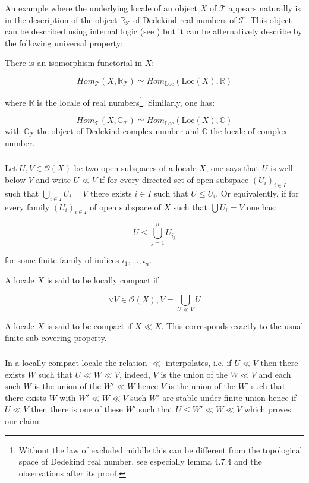 \documentclass[a4paper]{article}
\newcommand{\loc}{\text{Loc}}
\newcommand{\R}{\mathbb{R}}
\newcommand{\C}{\mathbb{C}}
\newcommand{\Tcal}{\mathcal{T}}
\newcommand{\Ocal}{\mathcal{O}}
\newcommand{\block}[1]
{

\par \subsubsection{} #1

\bigskip}
\newcommand{\blockn}[1]{\par #1 \bigskip}
\begin{document}
\blockn{An example where the underlying locale of an object $X$ of $\Tcal$ appears naturally is in the description of the object $\R_{\Tcal}$ of Dedekind real numbers of $\Tcal$. This object can be described using internal logic (see \cite[D4.7]{sketches}) but it can be alternatively describe by the following universal property:


There is an isomorphism functorial in $X$:

\[ Hom_{\Tcal}(X,\R_{\Tcal}) \simeq Hom_{\loc}(\loc(X), \R) \]

where $\R$ is the locale of real numbers\footnote{Without the law of excluded middle this can be different from the topological space of Dedekind real number, see \cite[D4.7]{sketches} especially lemma $4.7.4$ and the observations after its proof.}.
Similarly, one has:

\[ Hom_{\Tcal}(X,\C_{\Tcal}) \simeq Hom_{\loc}(\loc(X), \C) \]
with $\C_{\Tcal}$ the object of Dedekind complex number and $\C$ the locale of complex number.
}

\block{Let $U,V \in \Ocal(X)$ be two open subspaces of a locale $X$, one says that $U$ is well below $V$ and write $U \ll V$ if for every directed set of open subspace $(U_i)_{i \in I}$ such that $\bigcup_{i \in I} U_i =V$ there exists $i \in I$ such that $U \leqslant U_i$. Or equivalently, if for every family $(U_i)_{i \in I}$ of open subspace of $X$ such that $\bigcup U_i = V$ one has:

\[ U \leqslant \bigcup_{j=1}^n U_{i_j} \]

for some finite family of indices $i_1,\dots, i_n$.

A locale $X$ is said to be locally compact if

\[ \forall V \in \Ocal(X), V = \bigcup_{U \ll V} U \]

A locale $X$ is said to be compact if $X \ll X$. This corresponds exactly to the usual  finite sub-covering property.
}

\block{In a locally compact locale the relation $\ll$ interpolates, i.e. if $U \ll V$ then there exists $W$ such that $U \ll W \ll V$, indeed, $V$ is the union of the $W \ll V$ and each such $W$ is the union of the $W' \ll W$ hence $V$ is the union of the $W'$ such that there exists $W$ with $W' \ll W \ll V$ such $W'$ are stable under finite union hence if $U \ll V$ then there is one of these $W'$ such that $U \leqslant W' \ll W \ll V$ which proves our claim.}
\end{document}

